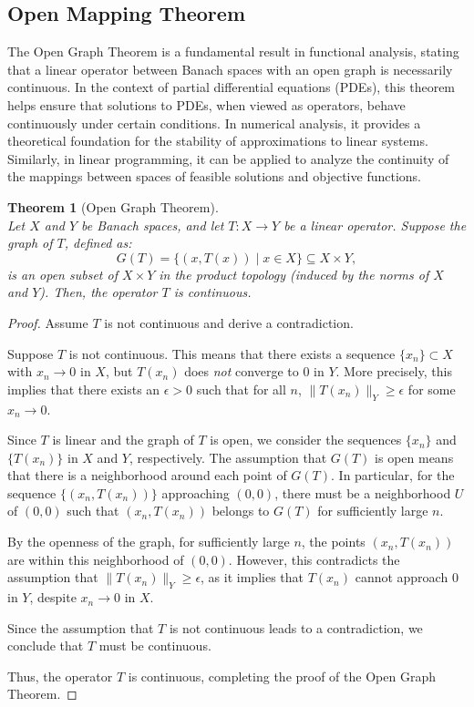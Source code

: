 \documentclass[12pt, reqno]{amsart}
\newtheorem{theorem}{Theorem}[section]
\theoremstyle{definition}
\numberwithin{equation}{section}
\begin{document}
\subsection{Open Mapping Theorem}
The Open Graph Theorem is a fundamental result in functional analysis, stating that a linear operator between Banach spaces with an open graph is necessarily continuous. In the context of partial differential equations (PDEs), this theorem helps ensure that solutions to PDEs, when viewed as operators, behave continuously under certain conditions. In numerical analysis, it provides a theoretical foundation for the stability of approximations to linear systems. Similarly, in linear programming, it can be applied to analyze the continuity of the mappings between spaces of feasible solutions and objective functions.
\pagebreak

\begin{theorem}[Open Graph Theorem] \hfill \\
Let $X$ and $Y$ be Banach spaces, and let $T : X \to Y$ be a linear operator. Suppose the graph of $T$, defined as:
$$ G(T) = \{ (x, T(x)) \mid x \in X \} \subseteq X \times Y, $$
is an \textit{open} subset of $X \times Y$ in the product topology (induced by the norms of $X$ and $Y$). Then, the operator $T$ is continuous.
\end{theorem}

\begin{proof}
Assume $T$ is not continuous and derive a contradiction.

Suppose $T$ is not continuous. This means that there exists a sequence $\{ x_n \} \subset X$ with $x_n \to 0$ in $X$, but $T(x_n)$ does \textit{not} converge to $0$ in $Y$. More precisely, this implies that there exists an $\epsilon > 0$ such that for all $n$, $\| T(x_n) \|_Y \geq \epsilon$ for some $x_n \to 0$.

Since $T$ is linear and the graph of $T$ is open, we consider the sequences $\{ x_n \}$ and $\{ T(x_n) \}$ in $X$ and $Y$, respectively. The assumption that $G(T)$ is open means that there is a neighborhood around each point of $G(T)$. In particular, for the sequence $\{ (x_n, T(x_n)) \}$ approaching $(0, 0)$, there must be a neighborhood $U$ of $(0, 0)$ such that $(x_n, T(x_n))$ belongs to $G(T)$ for sufficiently large $n$.


By the openness of the graph, for sufficiently large $n$, the points $(x_n, T(x_n))$ are within this neighborhood of $(0, 0)$. However, this contradicts the assumption that $\| T(x_n) \|_Y \geq \epsilon$, as it implies that $T(x_n)$ cannot approach $0$ in $Y$, despite $x_n \to 0$ in $X$.


Since the assumption that $T$ is not continuous leads to a contradiction, we conclude that $T$ must be continuous.

Thus, the operator $T$ is continuous, completing the proof of the Open Graph Theorem.
\end{proof}
\end{document}
